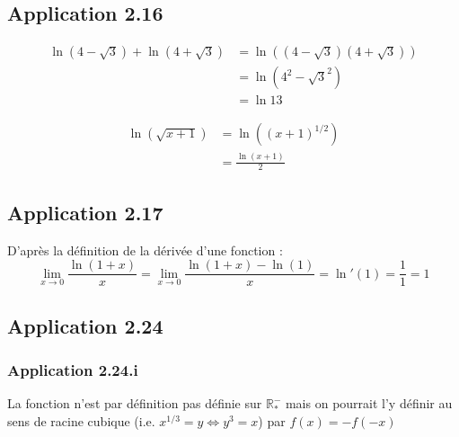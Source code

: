 \documentclass{report}
\begin{document}
\subsection*{Application 2.16}

\begin{equation*}
	\begin{split}
		\ln(4-\sqrt{3}) + \ln(4+\sqrt{3})
		&= \ln ((4-\sqrt{3})(4+\sqrt{3}))\\
		&= \ln (4^2-\sqrt{3}^2) \\
		&= \ln 13
	\end{split}
\end{equation*}

\begin{equation*}
	\begin{split}
		\ln(\sqrt{x+1})
		&= 	\ln((x+1)^{1/2})\\
		&= \frac{\ln(x+1)}{2}
	\end{split}
\end{equation*}

\subsection*{Application 2.17}
D'après la définition de la dérivée d'une fonction :
\begin{displaymath}
\lim_{x \rightarrow 0} \frac{\ln(1+x)}{x} = \lim_{x \rightarrow 0} \frac{\ln(1+x) - \ln(1)}{x} = \ln'(1) = \frac{1}{1} = 1
\end{displaymath}


\subsection*{Application 2.24}

\subsubsection*{Application 2.24.i}

La fonction n'est par définition pas définie sur $\mathbb{R}^-_*$ mais on pourrait l'y définir 
au sens de racine cubique (i.e. $x^{1/3}= y \Longleftrightarrow y^3 =x$) par $f(x) = -f(-x)$
\end{document}
